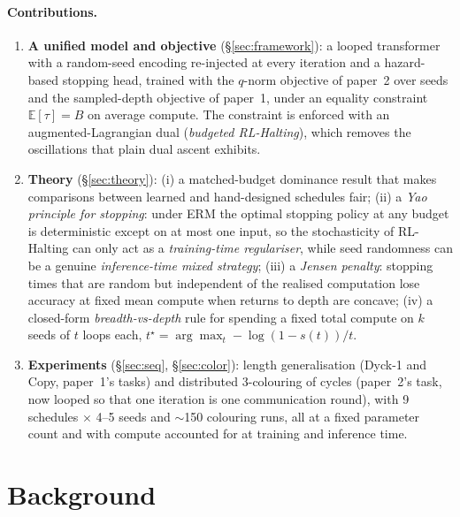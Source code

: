\documentclass[10pt]{article}
\theoremstyle{definition}
\theoremstyle{remark}
\newcommand{\E}{\mathbb{E}}
\begin{document}
\paragraph{Contributions.}
\begin{enumerate}
\item \textbf{A unified model and objective} (\S\ref{sec:framework}): a looped transformer with a random-seed
  encoding re-injected at every iteration and a hazard-based stopping head, trained with the $q$-norm objective
  of paper~2 over seeds and the sampled-depth objective of paper~1, under an equality constraint
  $\E[\tau]=B$ on average compute.  The constraint is enforced with an augmented-Lagrangian dual (\emph{budgeted
  RL-Halting}), which removes the oscillations that plain dual ascent exhibits.
\item \textbf{Theory} (\S\ref{sec:theory}): (i) a matched-budget dominance result that makes comparisons
  between learned and hand-designed schedules fair; (ii) a \emph{Yao principle for stopping}: under ERM the
  optimal stopping policy at any budget is deterministic except on at most one input, so the stochasticity of
  RL-Halting can only act as a \emph{training-time regulariser}, while seed randomness can be a genuine
  \emph{inference-time mixed strategy}; (iii) a \emph{Jensen penalty}: stopping times that are random but
  independent of the realised computation lose accuracy at fixed mean compute when returns to depth are
  concave; (iv) a closed-form \emph{breadth-vs-depth} rule for spending a fixed total compute on $k$ seeds
  of $t$ loops each, $t^\star=\arg\max_t -\log(1-s(t))/t$.
\item \textbf{Experiments} (\S\ref{sec:seq}, \S\ref{sec:color}): length generalisation (Dyck-1 and Copy,
  paper~1's tasks) and distributed 3-colouring of cycles (paper~2's task, now looped so that one iteration is
  one communication round), with 9 schedules $\times$ 4--5 seeds and $\sim$150 colouring runs, all at a fixed
  parameter count and with compute accounted for at training and inference time.
\end{enumerate}


\section{Background}
\label{sec:background}
\end{document}
